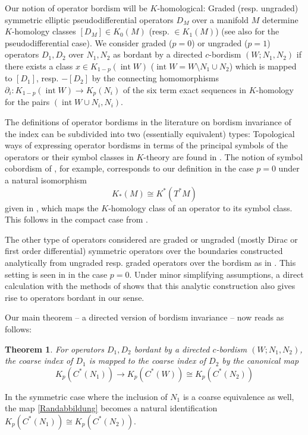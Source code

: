 \documentclass[a4paper]{amsproc}
\newtheorem{theorem}{Theorem}[section]
\theoremstyle{definition}
\theoremstyle{remark}
\numberwithin{equation}{section}
\begin{document}
Our notion of operator bordism will be $K$-homological:
Graded (resp. ungraded) symmetric elliptic pseudodifferential operators $D_M$ over a manifold $M$ determine $K$-homology classes $[D_M]\in K_0(M)$ (resp. $\in K_1(M)$) \cite[Chapter 10]{MR1817560} (see also
\cite{MR1153932} for the pseudodifferential case). We consider graded ($p=0$) or ungraded ($p=1$) operators $D_1,D_2$ over $N_1,N_2$ as bordant by a directed $c$-bordism $(W;N_1,N_2)$ if there exists a class $x\in K_{1-p}(\operatorname{int} W)$ ($\operatorname{int} W=W\setminus N_1\cup N_2$) which is mapped to
$[D_1]$, resp. $-[D_2]$ by the connecting homomorphisms
$\partial_i:K_{1-p}(\operatorname{int} W)\to K_p(N_i)$ of the six term exact sequences in $K$-homology for the pairs $(\operatorname{int} W\cup N_i,N_i)$.

The definitions of operator bordisms in the literature on bordism invariance of the index can be subdivided into two (essentially equivalent) types: Topological ways of expressing operator bordisms in terms of the principal symbols of the operators or their symbol classes in $K$-theory are found in
\cite{MR0198494,MR2274155,MR2231925}.
The notion of symbol cobordism of \cite{MR2274155}, for example,
corresponds to our definition in the case $p=0$ under a natural
isomorphism
\begin{equation*}
K_*(M)\cong K^*(T^*M)
\end{equation*}
given in \cite{MR0266247,MR1153932}, which maps the $K$-homology class of an operator to its symbol class. This follows in the compact case from \cite[Proposition 6.9]{MR1153932}.

The other type of operators considered are graded or ungraded (mostly Dirac or first order differential) symmetric operators over the boundaries constructed analytically from ungraded resp. graded operators over the bordism as in \cite[Chapter 4]{MR1399087}. This setting is seen in \cite{MR1113688,MR2139923,MR1231967,MR1873784,MR1402879} in the case $p=0$.
Under minor simplifying assumptions, a direct calculation with the methods of \cite[Chapters 9,10]{MR1817560} shows that this analytic construction also gives rise to operators bordant in our sense. 

Our main theorem -- a directed version of bordism invariance -- now reads as follows:
\begin{theorem}\label{maintheorem}
For operators $D_1,D_2$ bordant by a directed $c$-bordism $(W;N_1,N_2)$, the coarse index of $D_1$ is mapped to the coarse index of $D_2$ by the canonical map 
\begin{equation}\label{Randabbildung}
K_p(C^*(N_1))\to K_p(C^*(W))\cong K_p(C^*(N_2))
\end{equation}
\end{theorem}
In the symmetric case where the inclusion of $N_1$ is a coarse equivalence as well, the map \eqref{Randabbildung} becomes a natural identification $K_p(C^*(N_1))\cong K_p(C^*(N_2))$.
\end{document}
